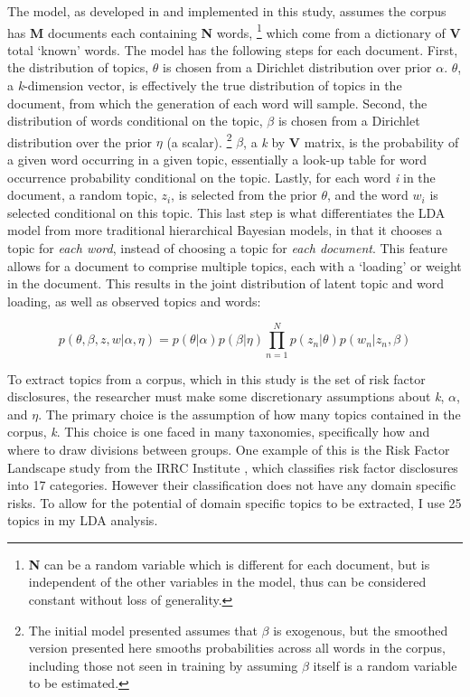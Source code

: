 The model, as developed in \cite{blei_2003} and implemented in this study, assumes the corpus has \textbf{M} documents each containing \textbf{N} words,%
\footnote{\textbf{N} can be a random variable which is different for each document, but is independent of the other variables in the model, thus can be considered constant without loss of generality.}
which come from a dictionary of \textbf{V} total `known' words.
The model has the following steps for each document.
First, the distribution of topics, $\theta$ is chosen from a Dirichlet distribution over prior $\alpha$.
$\theta$, a \textit{k}-dimension vector, is effectively the true distribution of topics in the document, from which the generation of each word will sample.
Second, the distribution of words conditional on the topic, $\beta$ is chosen from a Dirichlet distribution over the prior $\eta$ (a scalar).%
\footnote{The initial model presented assumes that $\beta$ is exogenous, but the smoothed version presented here smooths probabilities across all words in the corpus, including those not seen in training by assuming $\beta$ itself is a random variable to be estimated.}
$\beta$, a \textit{k} by \textbf{V} matrix, is the probability of a given word occurring in a given topic, essentially a look-up table for word occurrence probability conditional on the topic.
Lastly, for each word \textit{i} in the document, a random topic, $z_i$, is selected from the prior $\theta$, and the word $w_i$ is selected conditional on this topic.
This last step is what differentiates the LDA model from more traditional hierarchical Bayesian models, in that it chooses a topic for \textit{each word}, instead of choosing a topic for \textit{each document}.
This feature allows for a document to comprise multiple topics, each with a `loading' or weight in the document.
This results in the joint distribution of latent topic and word loading, as well as observed topics and words:

\begin{equation}
p(\theta,\beta,z,w | \alpha, \eta) = p(\theta | \alpha) p(\beta | \eta) \prod_{n=1}^{N} p(z_n | \theta) p(w_n | z_n, \beta)
\end{equation}  


To extract topics from a corpus, which in this study is the set of risk factor disclosures, the researcher must make some discretionary assumptions about \textit{k}, $\alpha$, and $\eta$.
The primary choice is the assumption of how many topics contained in the corpus, \textit{k}.
This choice is one faced in many taxonomies, specifically how and where to draw divisions between groups.
One example of this is the Risk Factor Landscape study from the IRRC Institute \citep{lukomnik_2016}, which classifies risk factor disclosures into 17 categories.
However their classification does not have any domain specific risks.
To allow for the potential of domain specific topics to be extracted, I use 25 topics in my LDA analysis.



